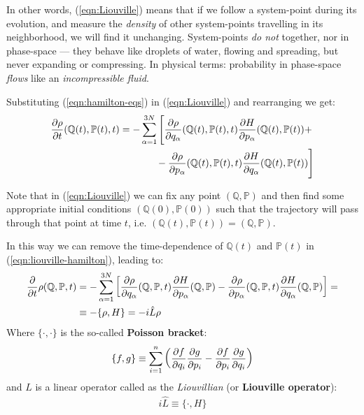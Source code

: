 \documentclass[../../main.tex]{subfiles}
\begin{document}
\medskip

In other words, (\ref{eqn:Liouville}) means that if we follow a system-point during its evolution, and measure the \textit{density} of other system-points travelling in its neighborhood, we will find it unchanging. System-points \textit{do not}  together, nor  in phase-space --- they behave like droplets of water, flowing and spreading, but never expanding or compressing. In physical terms: probability in phase-space \textit{flows} like an \textit{incompressible fluid}.   

\medskip

Substituting (\ref{eqn:hamilton-eqs}) in (\ref{eqn:Liouville}) and rearranging we get:
\begin{align} \nonumber
    {\pdv{\rho}{t}} (\mathbb{Q}(t), \mathbb{P}(t),t) &= -\sum_{\alpha=1}^{3N} \Bigg[{\pdv{\rho}{q_\alpha}}    (\mathbb{Q}(t), \mathbb{P}(t),t) {\pdv{H}{p_\alpha}}  (\mathbb{Q}(t), \mathbb{P}(t)) + \\   &\quad\>\>\hphantom{\sum_{\alpha=1}^{3N}\Bigg[} - {\pdv{\rho}{p_\alpha}} (\mathbb{Q}(t), \mathbb{P}(t),t) {\pdv{H}{q_\alpha}} (\mathbb{Q}(t), \mathbb{P}(t))
    \Bigg] \label{eqn:liouville-hamilton} 
\end{align}

Note that in (\ref{eqn:Liouville}) we can fix any point $(\mathbb{Q},\mathbb{P})$ and then find some appropriate initial conditions $(\mathbb{Q}(0), \mathbb{P}(0))$ such that the trajectory will pass through that point at time $t$, i.e. $(\mathbb{Q}(t), \mathbb{P}(t)) = (\mathbb{Q},\mathbb{P})$. 

In this way we can remove the time-dependence of $\mathbb{Q}(t)$ and $\mathbb{P}(t)$ in (\ref{eqn:liouville-hamilton}), leading to:
\begin{align}\label{eqn:liouville-hamilton-no-dep}
    \pdv{t} \rho(\mathbb{Q},\mathbb{P},t) &= - \sum_{\alpha=1}^{3N} \left[{\pdv{\rho}{q_\alpha}}
     (\mathbb{Q},\mathbb{P},t) {\pdv{H}{p_\alpha}}  (\mathbb{Q},\mathbb{P})
    - {\pdv{\rho}{p_\alpha}} (\mathbb{Q},\mathbb{P},t) {\pdv{H}{q_\alpha}} (\mathbb{Q},\mathbb{P})
    \right] =\\ \nonumber
    &\equiv - \{\rho, H\} = -i \hat{L} \rho
\end{align}
Where $\{\cdot, \cdot\}$ is the so-called \textbf{Poisson bracket}:
\begin{align*}
    \{f,g\} \equiv \sum_{i=1}^n \left(\pdv{f}{q_i} \pdv{g}{p_i} - \pdv{f}{p_i} \pdv{g}{q_i}\right)
\end{align*} 
and $\hat{L}$ is a linear operator called as the \textit{Liouvillian} (or \textbf{Liouville operator}):
\begin{align*}
    i \hat{L} \equiv \{\cdot, H\}
\end{align*}
\end{document}
